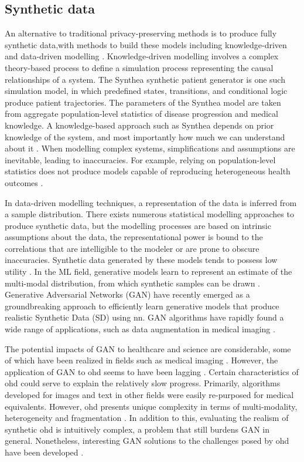 \subsection{Synthetic data}
An alternative to traditional privacy-preserving methods is to produce fully synthetic data,with methods to build these models including knowledge-driven and data-driven modelling \cite{Kim_2017}. Knowledge-driven modelling involves a complex theory-based process to define a simulation process representing the causal relationships of a system. The Synthea \cite{Walonoski_2017} synthetic patient generator is one such simulation model, in which predefined states, transitions, and conditional logic produce patient trajectories. The parameters of the Synthea model are taken from aggregate population-level statistics of disease progression and medical knowledge. A knowledge-based approach such as Synthea depends on prior knowledge of the system, and most importantly how much we can understand about it \cite{Kim_2017}. When modelling complex systems, simplifications and assumptions are inevitable, leading to inaccuracies. For example, relying on population-level statistics does not produce models capable of reproducing heterogeneous health outcomes \cite{Chen_2019}.\par
In data-driven modelling techniques, a representation of the data is inferred from a sample distribution. There exists numerous statistical modelling approaches to produce synthetic data, but the modelling processes are based on intrinsic assumptions about the data, the representational power is bound to the correlations that are intelligible to the modeler or are prone to obscure inaccuracies. Synthetic data generated by these models tends to possess low utility \cite{Rankin2020}. In the ML field, generative models learn to represent an estimate of the multi-modal distribution, from which synthetic samples can be drawn \cite{goodfellow2016nips}. Generative Adversarial Networks (GAN) \cite{NIPS2014_5423} have recently emerged as a groundbreaking approach to efficiently learn generative models that produce realistic Synthetic Data (SD) using \gls{nn}. GAN algorithms have rapidly found a wide range of applications, such as data augmentation in medical imaging \cite{Kadurin_2017}.\par
The potential impacts of GAN to healthcare and science are considerable, some of which have been realized in fields such as medical imaging \cite{Yi_2019}. However, the application of GAN to \gls{ohd} seems to have been lagging \cite{Xiao_2018}. Certain characteristics of \gls{ohd} could serve to explain the relatively slow progress. Primarily, algorithms developed for images and text in other fields were easily re-purposed for medical equivalents. However, \gls{ohd} presents unique complexity in terms of multi-modality, heterogeneity and fragmentation \cite{Xiao_2018}. In addition to this, evaluating the realism of synthetic \gls{ohd} is intuitively complex, a problem that still burdens GAN in general. Nonetheless, interesting GAN solutions to the challenges posed by \gls{ohd} have been developed \cite{esteban2017real,Che_2017,choi2017generating,yahi2017generative}.